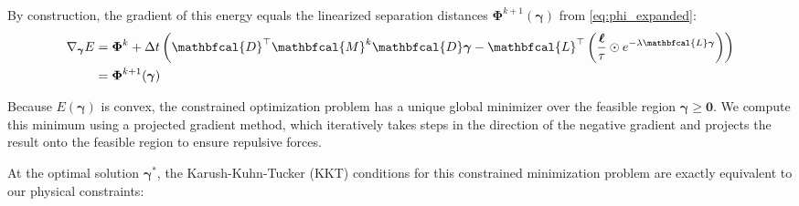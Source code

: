 \documentclass[conference]{IEEEtran}
\begin{document}
By construction, the gradient of this energy equals the linearized separation distances $\mathbf{\Phi}^{k+1}(\boldsymbol{\gamma})$ from \autoref{eq:phi_expanded}:
\begin{equation}
    \small
    \begin{split}
        \nabla_{\boldsymbol{\gamma}} E & = \boldsymbol{\Phi}^k + \Delta t \left( \mathbfcal{D}^\top \mathbfcal{M}^k \mathbfcal{D} \boldsymbol{\gamma} - \mathbfcal{L}^\top \left( \frac{\boldsymbol{\ell}}{\tau} \odot e^{-\lambda \mathbfcal{L} \boldsymbol{\gamma}} \right)  \right) \\
        & = \boldsymbol{\Phi}^{k+1}(\boldsymbol{\gamma})
    \end{split}
\end{equation}

Because $E(\boldsymbol{\gamma})$ is convex, the constrained optimization problem has a unique global minimizer over the feasible region $\boldsymbol{\gamma} \geq \mathbf{0}$. We compute this minimum using a projected gradient method, which iteratively takes steps in the direction of the negative gradient and projects the result onto the feasible region to ensure repulsive forces.

At the optimal solution $\boldsymbol{\gamma}^*$, the Karush-Kuhn-Tucker (KKT) conditions for this constrained minimization problem are exactly equivalent to our physical constraints:
\end{document}
